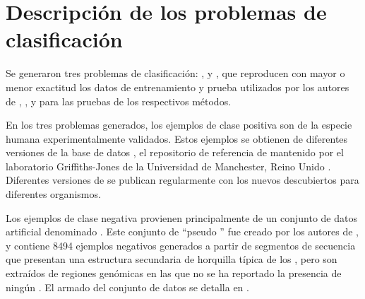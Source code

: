 %
%
%
\section{Descripción de los problemas de clasificación}
%
Se generaron tres {problemas} de clasificación: \prob\tripletsvm{},
\prob{\mipred} y \prob\micropred{}, que reproducen con mayor o menor
exactitud los datos de entrenamiento y prueba utilizados por los
autores de \work{\tripletsvm} \cite{xue}, \work{\mipred} \cite{ng}, y
\work{\micropred} \cite{batuwita} para las pruebas de los respectivos
métodos.

En los tres problemas generados, los ejemplos de clase positiva
son  de la especie humana experimentalmente validados.
Estos ejemplos se obtienen de diferentes versiones de la base de datos
\work{\mirbase}, el repositorio de referencia de 
mantenido por el laboratorio Griffiths-Jones de la Universidad de
Manchester, Reino Unido \cite{mirbase1, mirbase2, mirbase3}.
Diferentes versiones de \work\mirbase{} se publican regularmente con
los nuevos  descubiertos para diferentes organismos.

Los ejemplos de clase negativa provienen principalmente de un conjunto
de datos artificial denominado .
Este conjunto de ``pseudo '' fue creado por los autores de
\work{\tripletsvm}, y contiene 8494 ejemplos negativos generados a
partir de segmentos de secuencia que presentan una estructura
secundaria de horquilla típica de los , pero son extraídos
de regiones genómicas en las que no se ha reportado la presencia de
ningún \premirna{}.
El armado del conjunto de datos  se detalla en
\cite{xue}.
